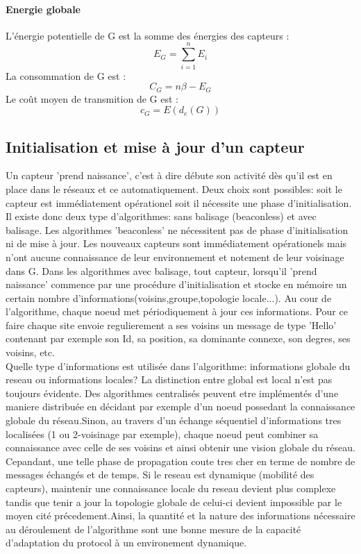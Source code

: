\paragraph{Energie globale}
\begin{mydef}
 L'énergie potentielle de G est la somme des énergies des capteurs :$$E_G=\sum_{i=1}^n{E_i}$$
 La consommation de  G est :$$C_G=n\beta - E_G$$
 Le coût moyen de transmition de  G est :$$c_G=E(d_e(G))$$

\end{mydef}

\subsection{Initialisation et mise à jour d'un capteur}
Un capteur 'prend naissance', c'est à dire débute son activité dès qu'il est en place dans le réseaux et ce automatiquement. Deux choix sont possibles: soit le capteur est immédiatement opérationel soit il nécessite une phase 
d'initialisation. Il existe donc deux type d'algorithmes: sans balisage (beaconless) et avec balisage. Les algorithmes 'beaconless' ne nécessitent pas de phase d'initialisation ni de mise à jour. Les nouveaux capteurs sont immédiatement 
opérationels mais n'ont aucune connaissance de leur environnement et notement de leur voisinage dans G. Dans les algorithmes avec balisage, tout capteur, lorsqu'il 'prend naissance' commence par une procédure d'initialisation et stocke en 
mémoire un certain nombre d'informations(voisins,groupe,topologie locale...). Au cour de l'algorithme, chaque noeud met périodiquement à jour ces informations. Pour ce faire chaque site envoie regulierement a ses voisins un message de type
'Hello' contenant par exemple son Id, sa position, sa dominante connexe, son degres, ses voisins, etc.\\
 

Quelle type d'informations est utilisée dans l'algorithme: informations globale du reseau ou informations locales? La distinction entre global est local n'est pas toujours évidente. Des algorithmes centralisés peuvent etre implémentés
 d'une maniere distribuée en décidant par exemple d'un noeud possedant la connaissance globale du réseau.Sinon, au travers d'un échange séquentiel d'informations tres localisées (1 ou 2-voisinage par exemple), chaque noeud peut combiner sa 
connaissance avec celle de ses voisins et ainsi obtenir une vision globale du réseau. Cepandant, une telle phase de propagation coute tres cher en terme de nombre de messages échangés et de temps.
Si le reseau est dynamique (mobilité des capteurs), maintenir une connaissance locale du reseau devient plus complexe tandis que tenir a jour la topologie globale de celui-ci devient impossible par le moyen cité précedement.Ainsi, 
la quantité et la nature des informations nécessaire au déroulement de l'algorithme sont une bonne mesure de la capacité d'adaptation du protocol à un environement dynamique.   

